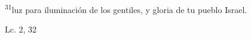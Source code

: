 \documentclass[../../rosario.tex]{subfiles}
\begin{document}
    \textsuperscript{31}luz para iluminación de los gentiles, y gloria de tu pueblo Israel.
    \begin{flushright}
    Lc. 2, 32        
    \end{flushright}
\end{document}
